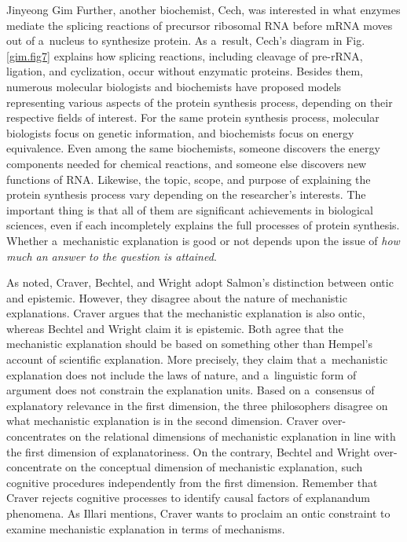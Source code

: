 \begin{artengenv}{Jinyeong Gim}
Further, another biochemist, Cech, was interested in what enzymes mediate the splicing reactions of precursor ribosomal RNA before mRNA moves out of a~nucleus to synthesize protein. As a~result, Cech's diagram in Fig. \ref{gim.fig7} explains how splicing reactions, including cleavage of pre-rRNA, ligation, and cyclization, occur without enzymatic proteins. Besides them, numerous molecular biologists and biochemists have proposed models representing various aspects of the protein synthesis process, depending on their respective fields of interest. For the same protein synthesis process, molecular biologists focus on genetic information, and biochemists focus on energy equivalence. Even among the same biochemists, someone discovers the energy components needed for chemical reactions, and someone else discovers new functions of RNA. Likewise, the topic, scope, and purpose of explaining the protein synthesis process vary depending on the researcher's interests. The important thing is that all of them are significant achievements in biological sciences, even if each incompletely explains the full processes of protein synthesis. Whether a~mechanistic explanation is good or not depends upon the issue of \textit{how much an answer to the question is attained}.

As noted, Craver, Bechtel, and Wright adopt Salmon's distinction between ontic and epistemic. However, they disagree about the nature of mechanistic explanations. Craver
\parencites*[][]{craver_when_2006}[][]{craver_explaining_2007}[][]{kaiser_ontic_2014} %
 argues that the mechanistic explanation is also ontic, whereas Bechtel and Wright 
\parencites[][]{wright_mechanisms_2007}[][]{wright_mechanistic_2012}[][]{wright_ontic_2015} %
 claim it is epistemic. Both agree that the mechanistic explanation should be based on something other than Hempel's account of scientific explanation. More precisely, they claim that a~mechanistic explanation does not include the laws of nature, and a~linguistic form of argument does not constrain the explanation units. Based on a~consensus of explanatory relevance in the first dimension, the three philosophers disagree on what mechanistic explanation is in the second dimension. Craver over-concentrates on the relational dimensions of mechanistic explanation in line with the first dimension of explanatoriness. On the contrary, Bechtel and Wright over-concentrate on the conceptual dimension of mechanistic explanation, such cognitive procedures independently from the first dimension. Remember that Craver rejects cognitive processes to identify causal factors of explanandum phenomena. As Illari mentions, Craver wants to proclaim an ontic constraint to examine mechanistic explanation in terms of mechanisms.


\end{artengenv}
